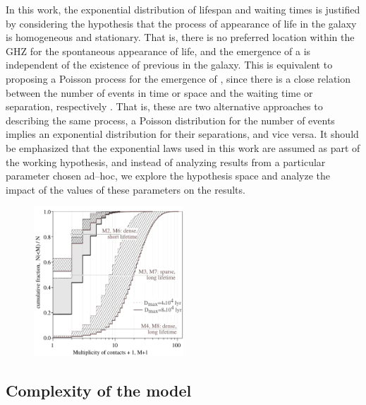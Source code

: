In this work, the exponential distribution of lifespan and waiting
times is justified by considering the hypothesis that the process of
appearance of life in the galaxy is homogeneous and stationary.
%
That is, there is no preferred location within the GHZ for the
spontaneous appearance of life, and the emergence of a \ceti{} is
independent of the existence of previous \cetis{} in the galaxy.
%            
This is equivalent to proposing a Poisson process for the emergence of
\cetis{}, since there is a close relation between the number of events
in time or space and the waiting time or separation, respectively
\citep[e.g., ][]{ross_simulation_2012}.
%
That is, these are two alternative approaches to describing the same
process, a Poisson distribution for the number of events implies an
exponential distribution for their separations, and vice versa.
%
It should be emphasized that the exponential laws used in this work
are assumed as part of the working hypothesis, and instead of
analyzing results from a particular parameter chosen ad--hoc, we
explore the hypothesis space and analyze the impact of the values of
these parameters on the results.
 
 
\begin{figure} \centering
   \includegraphics[width=0.5\textwidth]{F_number_of_contacts.pdf}
    \label{F_number_of_contacts}
\end{figure}
        
 

\subsection{Complexity of the model}

